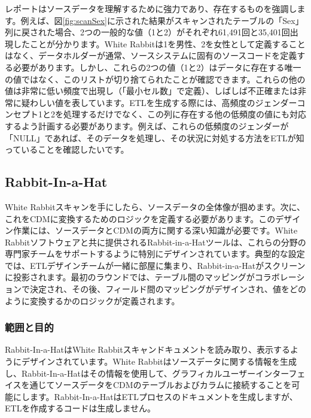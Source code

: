 \documentclass[
  11pt]{book}
\theoremstyle{definition}
\theoremstyle{definition}
\theoremstyle{definition}
\theoremstyle{definition}
\theoremstyle{remark}
\begin{document}
レポートはソースデータを理解するために強力であり、存在するものを強調します。例えば、図\ref{fig:scanSex}に示された結果がスキャンされたテーブルの「Sex」列に戻された場合、2つの一般的な値（1と2）がそれぞれ61,491回と35,401回出現したことが分かります。White Rabbitは1を男性、2を女性として定義することはなく、データホルダーが通常、ソースシステムに固有のソースコードを定義する必要があります。しかし、これらの2つの値（1と2）はデータに存在する唯一の値ではなく、このリストが切り捨てられたことが確認できます。これらの他の値は非常に低い頻度で出現し（「最小セル数」で定義）、しばしば不正確または非常に疑わしい値を表しています。ETLを生成する際には、高頻度のジェンダーコンセプト1と2を処理するだけでなく、この列に存在する他の低頻度の値にも対応するよう計画する必要があります。例えば、これらの低頻度のジェンダーが「NULL」であれば、そのデータを処理し、その状況に対処する方法をETLが知っていることを確認したいです。

\subsection{Rabbit-In-a-Hat}\label{rabbit-in-a-hat}

White Rabbitスキャンを手にしたら、ソースデータの全体像が掴めます。次に、これをCDMに変換するためのロジックを定義する必要があります。このデザイン作業には、ソースデータとCDMの両方に関する深い知識が必要です。White Rabbitソフトウェアと共に提供されるRabbit-in-a-Hatツールは、これらの分野の専門家チームをサポートするように特別にデザインされています。典型的な設定では、ETLデザインチームが一緒に部屋に集まり、Rabbit-in-a-Hatがスクリーンに投影されます。最初のラウンドでは、テーブル間のマッピングがコラボレーションで決定され、その後、フィールド間のマッピングがデザインされ、値をどのように変換するかのロジックが定義されます。 

\subsubsection*{範囲と目的}\label{ux7bc4ux56f2ux3068ux76eeux7684-1}

Rabbit-In-a-HatはWhite Rabbitスキャンドキュメントを読み取り、表示するようにデザインされています。White Rabbitはソースデータに関する情報を生成し、Rabbit-In-a-Hatはその情報を使用して、グラフィカルユーザーインターフェイスを通じてソースデータをCDMのテーブルおよびカラムに接続することを可能にします。Rabbit-In-a-HatはETLプロセスのドキュメントを生成しますが、ETLを作成するコードは生成しません。
\end{document}
